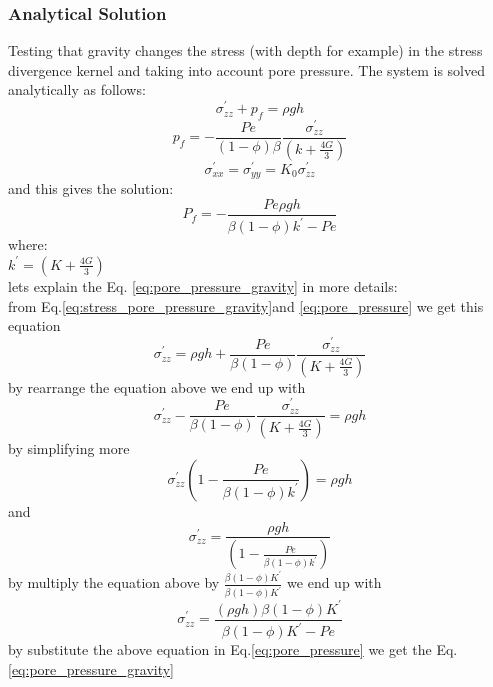\documentclass[]{scrreprt}
\begin{document}
\subsubsection{Analytical Solution}
Testing that gravity changes the stress (with depth for example) in the stress divergence kernel and taking into account pore pressure.
The system is solved analytically as follows:
\begin{equation}
\label{eq:stress_pore_pressure_gravity}
\sigma^{\prime}_{zz}+p_f=\rho g h
\end{equation}
\begin{equation}
p_f=-\frac{Pe}{(1-\phi)\beta}\frac{\sigma^{\prime}_{zz}}{(k+\frac{4G}{3})}
\end{equation}
\begin{equation}
\label{eq:pore_pressure}
\sigma^{\prime}_{xx}=\sigma^{\prime}_{yy}=K_0\sigma^{\prime}_{zz}
\end{equation}
and this gives the solution:
\begin{equation}
\label{eq:pore_pressure_gravity}
P_f=-\frac{Pe \rho g h}{\beta(1-\phi)k^{\prime}-Pe}
\end{equation}
where:\\
$k^{\prime}= (K+\frac{4G}{3})$\\
lets explain the Eq. \ref{eq:pore_pressure_gravity} in more details:\\ 
\ifshowallderivations
from Eq.\ref{eq:stress_pore_pressure_gravity}and \ref{eq:pore_pressure} we get this equation 
\begin{equation}
\sigma^{\prime}_{zz}=\rho g h + \frac{Pe}{\beta(1-\phi)}\frac{\sigma^{\prime}_{zz}}{(K+\frac{4G}{3})}
\end{equation}
by rearrange the equation above we end up with 
\begin{equation}
\sigma^{\prime}_{zz}-\frac{Pe}{\beta(1-\phi)}\frac{\sigma^{\prime}_{zz}}{(K+\frac{4G}{3})}=\rho g h
\end{equation}
by simplifying more 
\begin{equation}
\sigma^{\prime}_{zz}\left(1-\frac{Pe}{\beta(1-\phi)k^{\prime}}\right)=\rho g h
\end{equation}
and 
\begin{equation}
\sigma^{\prime}_{zz}=\frac{\rho g h}{\left(1-\frac{Pe}{\beta(1-\phi)k^{\prime}}\right)}
\end{equation}
by multiply the equation above by $ \frac{\beta(1-\phi)K^{\prime}}{\beta(1-\phi)K^{\prime}}$
we end up with 
\begin{equation}
\sigma^{\prime}_{zz}=\frac{(\rho g h)\beta(1-\phi)K^{\prime}}{\beta(1-\phi)K^{\prime}-Pe}
\end{equation}
by substitute the above equation in Eq.\ref{eq:pore_pressure} we get the Eq. \ref{eq:pore_pressure_gravity}
\fi
\end{document}
